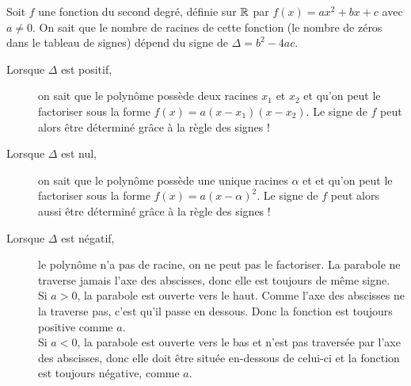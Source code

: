 \documentclass[a4paper,11pt]{article}
\begin{document}
\begin{cdemo}
Soit $f$ une fonction du second degré, définie sur $\R$ par $f(x)=ax^2+bx+c$ avec $a\ne0$. On sait que le nombre de racines de cette fonction (le nombre de zéros dans le tableau de signes) dépend du signe de $\Delta=b^2-4ac$. \vspace{-0.1cm}
\begin{description}
	\item[Lorsque $\Delta$ est positif,] on sait que le polynôme possède deux racines $x_1$ et $x_2$ et qu'on peut le factoriser sous la forme $f(x)=a(x-x_1)(x-x_2)$. Le signe de $f$ peut alors être déterminé grâce à la règle des signes ! \vspace{-0.15cm}
	\begin{center}
	\end{center}
	\item[Lorsque $\Delta$ est nul,] on sait que le polynôme possède une unique racines $\alpha$ et  et qu'on peut le factoriser sous la forme $f(x)=a(x-\alpha)^2$. Le signe de $f$ peut alors aussi être déterminé grâce à la règle des signes !  \vspace{-0.15cm}
	\begin{center}
	\end{center}
	\item[Lorsque $\Delta$ est négatif,] le polynôme n'a pas de racine, on ne peut pas le factoriser. La parabole ne traverse jamais l'axe des abscisses, donc elle est toujours de même signe. \\Si $a>0$, la parabole est ouverte vers le haut. Comme l'axe des abscisses ne la traverse pas, c'est qu'il passe en dessous. Donc la fonction est toujours positive comme $a$. \\ Si $a<0$, la parabole est ouverte vers le bas et n'est pas traversée par l'axe des abscisses, donc elle doit être située en-dessous de celui-ci et la fonction est toujours négative, comme $a$. \vspace{-0.15cm}
	\begin{center}
	\end{center}	
\end{description}
\end{cdemo}
\end{document}
